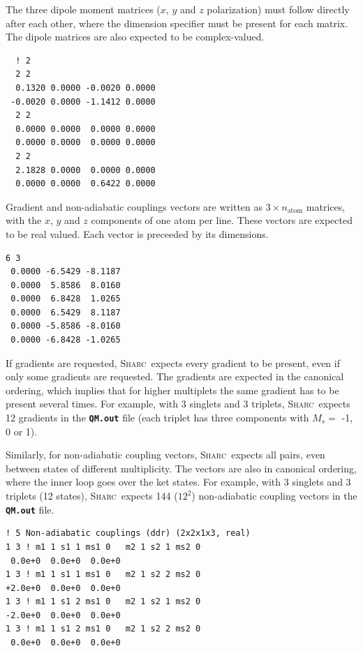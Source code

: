 \documentclass[a4paper,11pt,DIV=15,openany,twoside=false]{scrbook}
\newcommand{\sharc}{\textsc{Sharc}}
\newcommand{\ttt}[1]{\textbf{\texttt{#1}}}
\newenvironment{example}{
  \vspace{0mm}
  \definecolor{shadecolor}{HTML}{BBDDFF}
  \begin{shaded}
  \begin{minipage}{0.9\textwidth}
}{
  \end{minipage}
  \end{shaded}
}
\begin{document}
The three dipole moment matrices ($x$, $y$ and $z$ polarization) must follow directly after each other, where the dimension specifier must be present for each matrix. The dipole matrices are also expected to be complex-valued.
\begin{example}
  \begin{verbatim}
  ! 2
  2 2
  0.1320 0.0000 -0.0020 0.0000
 -0.0020 0.0000 -1.1412 0.0000
  2 2
  0.0000 0.0000  0.0000 0.0000
  0.0000 0.0000  0.0000 0.0000
  2 2
  2.1828 0.0000  0.0000 0.0000
  0.0000 0.0000  0.6422 0.0000
  \end{verbatim}
\end{example}

Gradient and non-adiabatic couplings vectors are written as $3\times n_\text{atom}$ matrices, with the $x$, $y$ and $z$ components of one atom per line. These vectors are expected to be real valued. Each vector is preceeded by its dimensions.
\begin{example}
  \begin{verbatim}
6 3 
 0.0000 -6.5429 -8.1187
 0.0000  5.8586  8.0160
 0.0000  6.8428  1.0265
 0.0000  6.5429  8.1187
 0.0000 -5.8586 -8.0160
 0.0000 -6.8428 -1.0265
  \end{verbatim}
\end{example}
If gradients are requested, \sharc\ expects every gradient to be present, even if only some gradients are requested. The gradients are expected in the canonical ordering, which implies that for higher multiplets the same gradient has to be present several times. For example, with 3 singlets and 3 triplets, \sharc\ expects 12 gradients in the \ttt{QM.out} file (each triplet has three components with $M_s=$ -1, 0 or 1).

Similarly, for non-adiabatic coupling vectors, \sharc\ expects all pairs, even between states of different multiplicity. The vectors are also in canonical ordering, where the inner loop goes over the ket states. For example, with 3 singlets and 3 triplets (12 states), \sharc\ expects 144 ($12^2$) non-adiabatic coupling vectors in the \ttt{QM.out} file.
\begin{example}
  \begin{verbatim}
! 5 Non-adiabatic couplings (ddr) (2x2x1x3, real)
1 3 ! m1 1 s1 1 ms1 0   m2 1 s2 1 ms2 0
 0.0e+0  0.0e+0  0.0e+0 
1 3 ! m1 1 s1 1 ms1 0   m2 1 s2 2 ms2 0
+2.0e+0  0.0e+0  0.0e+0 
1 3 ! m1 1 s1 2 ms1 0   m2 1 s2 1 ms2 0
-2.0e+0  0.0e+0  0.0e+0 
1 3 ! m1 1 s1 2 ms1 0   m2 1 s2 2 ms2 0
 0.0e+0  0.0e+0  0.0e+0 
  \end{verbatim}
\end{example}
\end{document}
